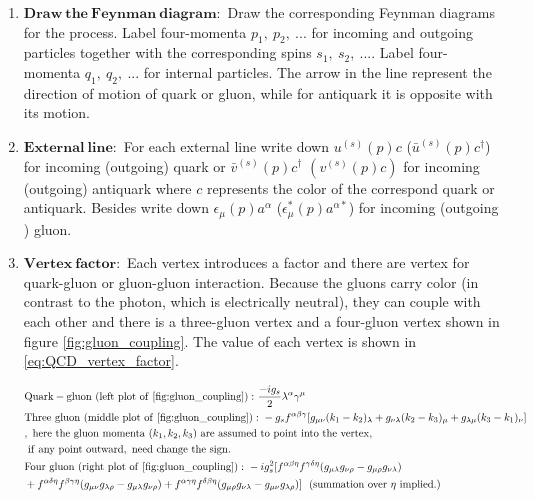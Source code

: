 \begin{enumerate}
\item $\mathbf{Draw~the~Feynman~diagram:}$ Draw the corresponding Feynman diagrams for the process. Label four-momenta $p_{1},~p_{2},~...$ for incoming and outgoing particles together with the corresponding spins $s_{1},~s_{2},~...$. Label four-momenta $q_{1},~q_{2},~...$ for internal particles. The arrow in the line represent the direction of motion of quark or gluon, while for antiquark it is opposite with its motion.
\item $\mathbf{External~line:}$ For each external line write down $u^{(s)}(p)c$ ($\bar{u}^{(s)}(p)c^{\dag}$) for incoming (outgoing)  quark or $\bar{v}^{(s)}(p)c^{\dag}$ $(v^{(s)}(p)c)$ for incoming (outgoing) antiquark where $c$ represents the color of the correspond quark or antiquark. Besides write down $\epsilon_{\mu}(p)a^{\alpha}$ ($\epsilon_{\mu}^{\ast}(p)a^{\alpha\ast}$) for incoming (outgoing ) gluon.
\item $\mathbf{Vertex~factor:}$ Each vertex introduces a factor and there are vertex for quark-gluon or gluon-gluon interaction. Because the gluons carry color (in contrast to the photon, which is electrically neutral), they can couple with each other and there is a three-gluon vertex and a four-gluon vertex shown in figure \ref{fig:gluon_coupling}. The value of each vertex is shown in \ref{eq:QCD_vertex_factor}.

\begin{equation}
\begin{split}
&\mathrm{Quark-gluon~(left~plot~of~\ref{fig:gluon_coupling}):}~\frac{-ig_{s}}{2}\lambda^{\alpha}\gamma^{\mu} \\
&\mathrm{Three~gluon~(middle~plot~of~\ref{fig:gluon_coupling}):}~-g_{s}f^{\alpha\beta\gamma}[g_{\mu\nu}(k_{1}-k_{2})_{\lambda}+g_{\nu\lambda}(k_{2}-k_{3})_{\mu}
+g_{\lambda\mu}(k_{3}-k_{1})_{\nu}]\\
&\mathrm{,~here~the~gluon~momenta~}(k_{1},k_{2},k_{3})\mathrm{~are~assumed~to~point~into~the~vertex,}\\
&\mathrm{~if~any~point~outward,~need~change~the~sign.}\\
&\mathrm{Four~gluon~(right~plot~of~\ref{fig:gluon_coupling}):}~-ig_{s}^{2}[f^{\alpha\beta\eta}f^{\gamma\delta\eta}(g_{\mu\lambda}g_{\nu\rho}-g_{\mu\rho}g_{\nu\lambda})\\
&+f^{\alpha\delta\eta}f^{\beta\gamma\eta}(g_{\mu\nu}g_{\lambda\rho}-g_{\mu\lambda}g_{\nu\rho})+f^{\alpha\gamma\eta}f^{\delta\beta\eta}(g_{\mu\rho}g_{\nu\lambda}-g_{\mu\nu}g_{\lambda\rho})]
~~(\mathrm{summation~over}~\eta\mathrm{~implied.})
\end{split}
\label{eq:QCD_vertex_factor}
\end{equation}


\end{enumerate}
